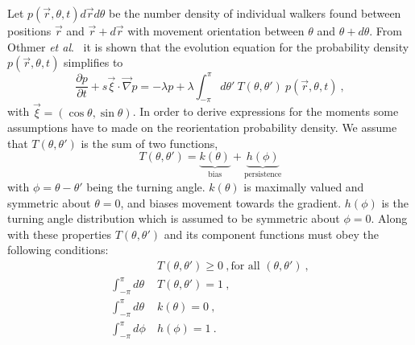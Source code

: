 Let $p(\vec{r},\theta,t) d\vec{r} d\theta$ be the number density of individual walkers found between positions $\vec{r}$ and $\vec{r}+d\vec{r}$ with movement orientation between $\theta$ and $\theta + d\theta$. From Othmer \textit{et al}.\ \cite{othmer1988models} it is shown that the evolution equation for the probability density $p(\vec{r},\theta,t)$ simplifies to
\begin{equation} \label{eq:p1}
    \frac{\partial p}{\partial t} + s \vec{\xi}\cdot\vec{\nabla} p =
    -\lambda p + \lambda \int_{-\pi}^{\pi} d\theta' \ T(\theta,\theta') \ p(\vec{r},\theta,t) \ ,
\end{equation}
with $\vec{\xi} = (\cos\theta,\sin\theta)$. In order to derive expressions for the moments some assumptions have to made on the reorientation probability density. We assume that $T(\theta,\theta')$ is the sum of two functions,
\begin{equation} \label{eq:t1}
    T(\theta,\theta') = \underbrace{k(\theta)}_\text{bias}
    + \underbrace{h(\phi)}_\text{persistence}
\end{equation}
with $\phi = \theta - \theta'$ being the turning angle. $k(\theta)$ is maximally valued and symmetric about $\theta = 0$, and biases movement towards the gradient. $h(\phi)$ is the turning angle distribution which is assumed to be symmetric about $\phi = 0$. Along with these properties $T(\theta,\theta')$ and its component functions must obey the following conditions:
\begin{align} \label{eq:t2}
    &T(\theta,\theta') \geq 0 \ , \text{for all } (\theta,\theta') \ , \\
    \int_{-\pi}^{\pi} d\theta \ &T(\theta,\theta') = 1 \ , \label{eq:t3} \\
    \int_{-\pi}^{\pi} d\theta  \ &k(\theta)         = 0 \ , \label{eq:t4} \\
    \int_{-\pi}^{\pi} d\phi    \ &h(\phi)           = 1 \ . \label{eq:t5}
\end{align}


